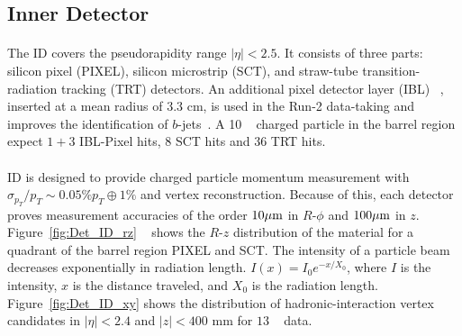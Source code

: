 \subsection{Inner Detector}
\paragraph{}
The ID covers the pseudorapidity range $|\eta| < 2.5$.
It consists of three parts: silicon pixel (PIXEL), silicon microstrip (SCT), and straw-tube transition-radiation tracking (TRT) detectors. 
An additional pixel detector layer (IBL) ~\cite{Capeans:1291633}, inserted at a mean radius of $3.3$ cm, is used in the Run-2 data-taking and improves the identification of $b$-jets~\cite{ATL-PHYS-PUB-2015-022}. A 10 \GeV~ charged particle in the barrel region expect $1+3$ IBL-Pixel hits, $8$ SCT hits and $36$ TRT hits.
\paragraph{}
ID is designed to provide charged particle momentum measurement with $\sigma_{p_{T}}/p_{T} \sim 0.05\% p_{T} \oplus 1\%$ and vertex reconstruction.
Because of this, each detector proves measurement accuracies of the order $10 \mu\rm m$ in $R$-$\phi$ and $100 \mu\rm m$ in $z$.
Figure~\ref{fig:Det_ID_rz} ~\cite{Aaboud:2017pjd} shows the $R$-$z$ distribution of the material for a quadrant of the barrel region PIXEL and SCT. The intensity of a particle beam decreases exponentially in radiation length. $I(x) = I_0 e^{-x/X_0}$, where $I$ is the intensity, $x$ is the distance traveled, and $X_0$ is the radiation length. Figure~\ref{fig:Det_ID_xy} shows the distribution of hadronic-interaction vertex candidates in $|\eta|<2.4$ and $|z|<400$ mm for $13$ \TeV~ data. 

